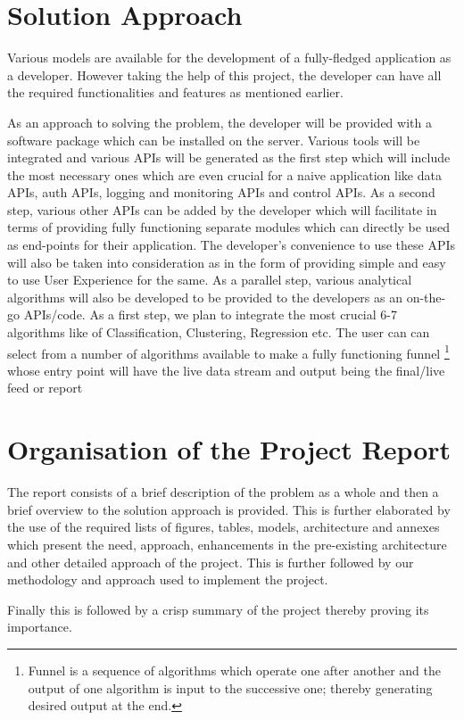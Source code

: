 \documentclass[a4paper,12pt]{report}
\begin{document}
    \section{Solution Approach}
Various models are available for the development of a fully-fledged application as a developer. However taking the help of this project, the developer can have all the required functionalities and features as mentioned earlier.

As an approach to solving the problem, the developer will be provided with a software package which can be installed on the server. Various tools will be integrated and various APIs will be generated as the first step which will include the most necessary ones which are even crucial for a naive application like data APIs, auth APIs, logging and monitoring APIs and control APIs.
As a second step, various other APIs can be added by the developer which will facilitate in terms of providing fully functioning separate modules which can directly be used as end-points for their application.
The developer’s convenience to use these APIs will also be taken into consideration as in the form of providing simple and easy to use User Experience for the same.
As a parallel step, various analytical algorithms will also be developed to be provided to the developers as an on-the-go APIs/code. As a first step, we plan to integrate the most crucial 6-7 algorithms like of Classification, Clustering, Regression etc.
The user can can select from a number of algorithms available to make a fully functioning funnel \footnote{Funnel is a sequence of algorithms which operate one after another and the output of one algorithm is input to the successive one; thereby generating desired output at the end.} whose entry point will have the live data stream and output being the final/live feed or report    
\section{Organisation of the Project Report}    
The report consists of a brief description of the problem as a whole and then a brief overview to the solution approach is provided. This is further elaborated by the use of the required lists of figures, tables, models, architecture and annexes which present the need, approach, enhancements in the pre-existing architecture and other detailed approach of the project. This is further followed by our methodology and approach used to implement the project.

Finally this is followed by a crisp summary of the project thereby proving its importance.
\end{document}
